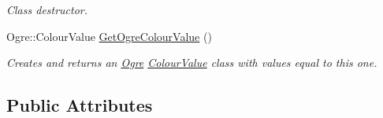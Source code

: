 \begin{DoxyCompactItemize}
\begin{DoxyCompactList}\small\item\em Class destructor. \item\end{DoxyCompactList}\item 
Ogre::ColourValue \hyperlink{classphys_1_1ColourValue_a7a2978ebc5a7e04e02279664f1ea4a86}{GetOgreColourValue} ()
\begin{DoxyCompactList}\small\item\em Creates and returns an \hyperlink{namespaceOgre}{Ogre} \hyperlink{classphys_1_1ColourValue}{ColourValue} class with values equal to this one. \item\end{DoxyCompactList}\end{DoxyCompactItemize}
\subsection*{Public Attributes}
